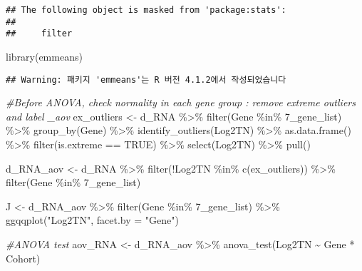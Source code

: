 \documentclass[
]{article}
\newenvironment{Shaded}{\begin{snugshade}}{\end{snugshade}}
\newcommand{\AttributeTok}[1]{\textcolor[rgb]{0.77,0.63,0.00}{#1}}
\newcommand{\CommentTok}[1]{\textcolor[rgb]{0.56,0.35,0.01}{\textit{#1}}}
\newcommand{\ConstantTok}[1]{\textcolor[rgb]{0.00,0.00,0.00}{#1}}
\newcommand{\FunctionTok}[1]{\textcolor[rgb]{0.00,0.00,0.00}{#1}}
\newcommand{\NormalTok}[1]{#1}
\newcommand{\OtherTok}[1]{\textcolor[rgb]{0.56,0.35,0.01}{#1}}
\newcommand{\SpecialCharTok}[1]{\textcolor[rgb]{0.00,0.00,0.00}{#1}}
\newcommand{\StringTok}[1]{\textcolor[rgb]{0.31,0.60,0.02}{#1}}
\begin{document}
\begin{verbatim}
## The following object is masked from 'package:stats':
## 
##     filter
\end{verbatim}

\begin{Shaded}
\begin{Highlighting}[]
\FunctionTok{library}\NormalTok{(emmeans)}
\end{Highlighting}
\end{Shaded}

\begin{verbatim}
## Warning: 패키지 'emmeans'는 R 버전 4.1.2에서 작성되었습니다
\end{verbatim}

\begin{Shaded}
\begin{Highlighting}[]
\CommentTok{\#Before ANOVA, check normality in each gene group : remove extreme outliers and label \textquotesingle{}\_aov\textquotesingle{}}
\NormalTok{ex\_outliers }\OtherTok{\textless{}{-}}\NormalTok{ d\_RNA }\SpecialCharTok{\%\textgreater{}\%} 
  \FunctionTok{filter}\NormalTok{(Gene }\SpecialCharTok{\%in\%} \StringTok{\textasciigrave{}}\AttributeTok{7\_gene\_list}\StringTok{\textasciigrave{}}\NormalTok{) }\SpecialCharTok{\%\textgreater{}\%}
  \FunctionTok{group\_by}\NormalTok{(Gene) }\SpecialCharTok{\%\textgreater{}\%}
  \FunctionTok{identify\_outliers}\NormalTok{(Log2TN) }\SpecialCharTok{\%\textgreater{}\%}
  \FunctionTok{as.data.frame}\NormalTok{() }\SpecialCharTok{\%\textgreater{}\%}
  \FunctionTok{filter}\NormalTok{(is.extreme }\SpecialCharTok{==} \ConstantTok{TRUE}\NormalTok{) }\SpecialCharTok{\%\textgreater{}\%}
  \FunctionTok{select}\NormalTok{(Log2TN) }\SpecialCharTok{\%\textgreater{}\%}
  \FunctionTok{pull}\NormalTok{()}

\NormalTok{d\_RNA\_aov }\OtherTok{\textless{}{-}}\NormalTok{ d\_RNA }\SpecialCharTok{\%\textgreater{}\%}
  \FunctionTok{filter}\NormalTok{(}\SpecialCharTok{!}\NormalTok{Log2TN }\SpecialCharTok{\%in\%} \FunctionTok{c}\NormalTok{(ex\_outliers)) }\SpecialCharTok{\%\textgreater{}\%}
  \FunctionTok{filter}\NormalTok{(Gene }\SpecialCharTok{\%in\%} \StringTok{\textasciigrave{}}\AttributeTok{7\_gene\_list}\StringTok{\textasciigrave{}}\NormalTok{)}

\NormalTok{J }\OtherTok{\textless{}{-}}\NormalTok{ d\_RNA\_aov }\SpecialCharTok{\%\textgreater{}\%}
  \FunctionTok{filter}\NormalTok{(Gene }\SpecialCharTok{\%in\%} \StringTok{\textasciigrave{}}\AttributeTok{7\_gene\_list}\StringTok{\textasciigrave{}}\NormalTok{) }\SpecialCharTok{\%\textgreater{}\%}
  \FunctionTok{ggqqplot}\NormalTok{(}\StringTok{"Log2TN"}\NormalTok{, }\AttributeTok{facet.by =} \StringTok{"Gene"}\NormalTok{)}

\CommentTok{\#ANOVA test}
\NormalTok{aov\_RNA }\OtherTok{\textless{}{-}}\NormalTok{ d\_RNA\_aov }\SpecialCharTok{\%\textgreater{}\%} \FunctionTok{anova\_test}\NormalTok{(Log2TN }\SpecialCharTok{\textasciitilde{}}\NormalTok{ Gene }\SpecialCharTok{*}\NormalTok{ Cohort)}
\end{Highlighting}
\end{Shaded}
\end{document}
